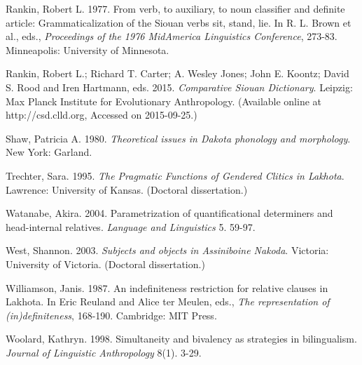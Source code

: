 \begin{refsection}
\begin{reflist}
Rankin, Robert L. 1977. From verb, to auxiliary, to noun classifier and definite article: Grammaticalization of the Siouan verbs sit, stand, lie. In R. L. Brown et al., eds., \textit{Proceedings of the 1976 MidAmerica Linguistics Conference}, 273-83. Minneapolis: University of Minnesota.  

Rankin, Robert L.; Richard T. Carter; A. Wesley Jones; John E. Koontz; David S. Rood and Iren Hartmann, eds. 2015. \textit{Comparative Siouan Dictionary}. Leipzig: Max Planck Institute for Evolutionary Anthropology. (Available online at http://csd.clld.org, Accessed on 2015-09-25.) 

Shaw, Patricia A. 1980. \textit{Theoretical issues in Dakota phonology and morphology}. New York: Garland.

Trechter, Sara. 1995. \textit{The Pragmatic Functions of Gendered Clitics in Lakhota}. Lawrence: University of Kansas. (Doctoral dissertation.) 

Watanabe, Akira. 2004. Parametrization of quantificational determiners and head-internal relatives. \textit{Language and Linguistics} 5. 59-97.

West, Shannon. 2003. \textit{Subjects and objects in Assiniboine Nakoda}. Victoria: University of Victoria. (Doctoral dissertation.)

Williamson, Janis. 1987. An indefiniteness restriction for relative clauses in Lakhota. In Eric Reuland and Alice ter Meulen, eds., \textit{The representation of (in)definiteness}, 168-190. Cambridge: MIT Press. 

Woolard, Kathryn. 1998. Simultaneity and bivalency as strategies in bilingualism. \textit{Journal of Linguistic Anthropology} 8(1). 3-29.


\end{reflist}

%

\end{refsection}

